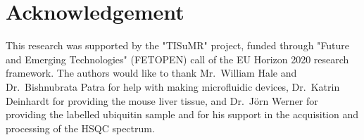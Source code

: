 \documentclass[preprint,5p]{elsarticle}
\begin{document}
\section{Acknowledgement}
This research was supported by the "TISuMR" project,
funded through "Future and Emerging Technologies" (FETOPEN) 
call of the EU Horizon 2020 research framework. The authors would like to 
thank Mr.~William Hale and Dr.~Bishnubrata Patra for help with
making microfluidic devices, Dr.~Katrin Deinhardt for providing 
the mouse liver tissue, and Dr.~Jörn Werner for providing the 
labelled ubiquitin sample and for his support in the acquisition
and processing of the HSQC spectrum.
\clearpage


\end{document}
